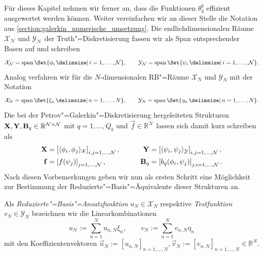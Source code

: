\documentclass[../main.tex]{subfiles}
\begin{document}
Für dieses Kapitel nehmen wir ferner an, dass die Funktionen $\theta_{q}^{b}$ effizient ausgewertet werden können.
Weiter vereinfachen wir an dieser Stelle die Notation aus \cref{section:galerkin_numerische_umsetzung}.
Die endlichdimensionalen Räume $\mathcal X_{\mathcal N}$ und $\mathcal Y_{\mathcal N}$ der Truth"=Diskretisierung fassen wir als Span entsprechender Basen auf und schreiben
\begin{equation}
    \mathcal X_{\mathcal N} = \spn \Set{ \phi_{i} \given i = 1, \dots, \mathcal N },
    \qquad
    \mathcal Y_{\mathcal N} = \spn \Set{ \psi_{i} \given i = 1, \dots, \mathcal N }.
\end{equation}
Analog verfahren wir für die $N$-dimensionalen RB"=Räume $\mathcal X_{N}$ und $\mathcal Y_{N}$ mit der Notation
\begin{equation}
    \mathcal X_{N} = \spn \Set{ \xi_{n} \given n = 1, \dots, N},
    \qquad
    \mathcal Y_{N} = \spn \Set{ \eta_{n} \given n = 1, \dots, N}.
\end{equation}
Die bei der Petrov"=Galerkin"=Diskretisierung hergeleiteten Strukturen $\mathbf{X}, \mathbf{Y}, \mathbf{B}_q \in \mathbb{R}^{\mathcal N \times \mathcal N}$ mit $q = 1, \dots, Q_b$ und $\vec{f} \in \mathbb{R}^{\mathcal N}$ lassen sich damit kurz schreiben als
\begin{equation}
    \begin{aligned}
        \mathbf{X} &= \left[ \langle\phi_{i},\phi_{j}\rangle_{\mathcal X} \right]_{i,j = 1, \dots, \mathcal N},
        &\qquad
        \mathbf{Y} &= \left[ \langle\psi_{i},\psi_{j}\rangle_{\mathcal Y} \right]_{i,j = 1, \dots, \mathcal N},
        \\
        \mathbf{f} &= \left[ f(\psi_{j}) \right]_{j = 1, \dots, \mathcal N},
        &\qquad
        \mathbf{B}_{q} &= \left[ b_{q}(\phi_{i}, \psi_{j}) \right]_{j,i = 1, \dots, \mathcal N}.
    \end{aligned}
\end{equation}
Nach diesen Vorbemerkungen geben wir nun als ersten Schritt eine Möglichkeit zur Bestimmung der Reduzierte"=Basis"=Äquivalente dieser Strukturen an.

\begin{Definition}\label{definition:rb_ansatz_und_testfunktionen}
    Als \emph{Reduzierte"=Basis"=Ansatzfunktion} $u_{N} \in \mathcal X_{N}$ respektive \emph{Testfunktion} $v_{N} \in \mathcal Y_{N}$ bezeichnen wir die Linearkombinationen
    \begin{equation}
        u_{N} := \sum_{n = 1}^{N} u_{n, N} \xi_{n},
        \qquad
        v_{N} := \sum_{n = 1}^{N} v_{n, N} \eta_{n}
    \end{equation}
    mit den Koeffizientenvektoren $\vec{u}_{N} := [u_{n, N}]_{n = 1, \dots, N}, \vec{v}_{N} := [v_{n,N}]_{n = 1, \dots, N} \in \mathbb{R}^{N}$.
\end{Definition}
\end{document}

